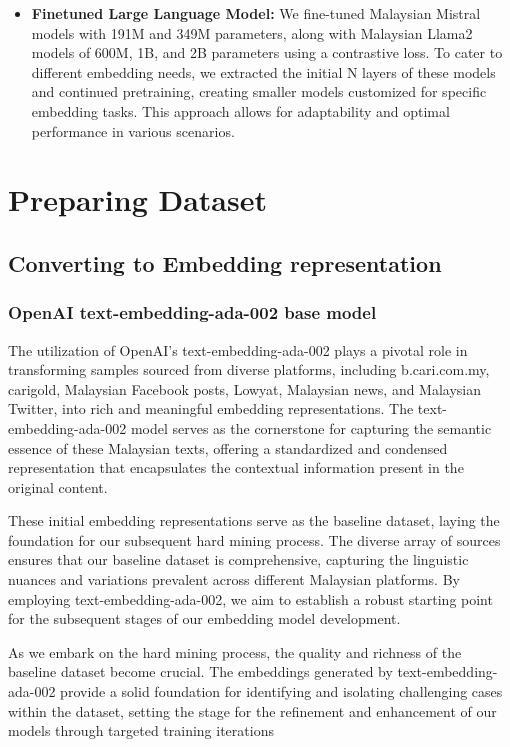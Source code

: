 \documentclass[preprint]{article}
\begin{document}
\begin{itemize}
  \item \textbf{Finetuned Large Language Model:} We fine-tuned Malaysian Mistral \cite{zolkepli2024large} models with 191M and 349M parameters, along with Malaysian Llama2 models of 600M, 1B, and 2B parameters using a contrastive loss. To cater to different embedding needs, we extracted the initial N layers of these models and continued pretraining, creating smaller models customized for specific embedding tasks. This approach allows for adaptability and optimal performance in various scenarios.
\end{itemize}

\section{Preparing Dataset}

\subsection{Converting to Embedding representation}

\subsubsection{OpenAI text-embedding-ada-002 base model}

The utilization of OpenAI's text-embedding-ada-002 plays a pivotal role in transforming samples sourced from diverse platforms, including b.cari.com.my, carigold, Malaysian Facebook posts, Lowyat, Malaysian news, and Malaysian Twitter, into rich and meaningful embedding representations. The text-embedding-ada-002 model serves as the cornerstone for capturing the semantic essence of these Malaysian texts, offering a standardized and condensed representation that encapsulates the contextual information present in the original content.

These initial embedding representations serve as the baseline dataset, laying the foundation for our subsequent hard mining process. The diverse array of sources ensures that our baseline dataset is comprehensive, capturing the linguistic nuances and variations prevalent across different Malaysian platforms. By employing text-embedding-ada-002, we aim to establish a robust starting point for the subsequent stages of our embedding model development.

As we embark on the hard mining process, the quality and richness of the baseline dataset become crucial. The embeddings generated by text-embedding-ada-002 provide a solid foundation for identifying and isolating challenging cases within the dataset, setting the stage for the refinement and enhancement of our models through targeted training iterations
\end{document}

